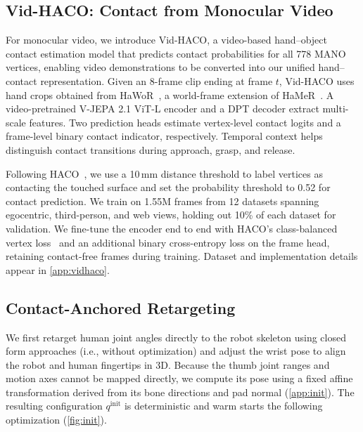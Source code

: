 \subsection{Vid-HACO: Contact from Monocular Video}
\label{sec:method:vidhaco}

For monocular video, we introduce Vid-HACO, a video-based hand–object contact estimation model that predicts contact probabilities for all 778 MANO vertices, enabling video demonstrations to be converted into our unified hand–contact representation. Given an 8-frame clip ending at frame $t$, Vid-HACO uses hand crops obtained from HaWoR~\citep{hawor}, a world-frame extension of HaMeR~\citep{hamer}. A video-pretrained V-JEPA 2.1 ViT-L encoder \citep{vjepa21} and a DPT decoder \citep{dpt} extract multi-scale features. Two prediction heads estimate vertex-level contact logits and a frame-level binary contact indicator, respectively. Temporal context helps distinguish contact transitions during approach, grasp, and release.

Following HACO~\citep{haco}, we use a 10\,mm distance threshold to label vertices as contacting the touched surface and set the probability threshold to 0.52 for contact prediction. We train on 1.55M frames from 12 datasets spanning egocentric, third-person, and web views, holding out 10\% of each dataset for validation. We fine-tune the encoder end to end with HACO's class-balanced vertex loss~\citep{cbloss} and an additional binary cross-entropy loss on the frame head, retaining contact-free frames during training. Dataset and implementation details appear in \cref{app:vidhaco}.

\subsection{Contact-Anchored Retargeting}
\label{sec:method:retarget}

 We first retarget human joint angles directly to the robot skeleton using closed form approaches (i.e., without optimization) and adjust the wrist pose to align the robot and human fingertips in 3D. Because the thumb joint ranges and motion axes cannot be mapped directly, we compute its pose using a fixed affine transformation derived from its bone directions and pad normal (\cref{app:init}). The resulting configuration $q^{\mathrm{init}}$ is deterministic and warm starts the following optimization (\cref{fig:init}).


